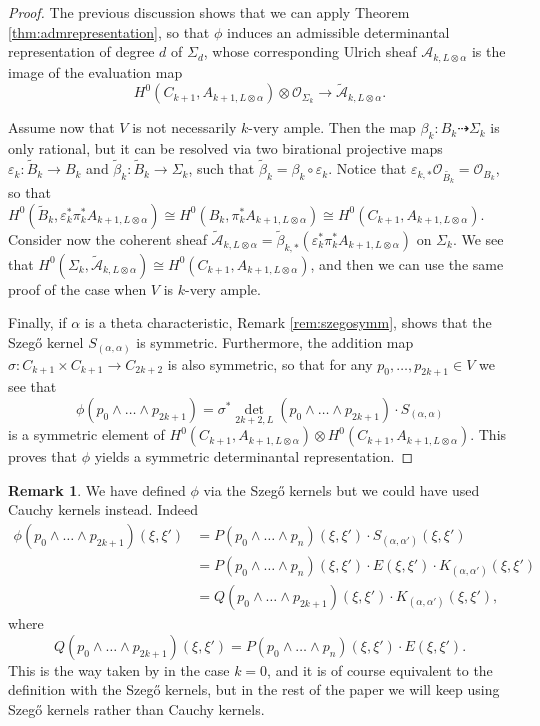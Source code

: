 \documentclass[12pt]{amsart}
\newcounter{thmcounter}
\numberwithin{equation}{section}
\numberwithin{thmcounter}{section}
\theoremstyle{definition}
\newtheorem{remark}[thmcounter]{Remark}
\theoremstyle{claim}
\newcommand{\sA}{\mathscr{A}}
\newcommand{\sO}{\mathscr{O}}
\begin{document}
\begin{proof}
	\noindent
	The previous discussion shows that we can apply Theorem \ref{thm:admrepresentation}, so that $\phi$ induces an admissible determinantal representation of degree $d$ of $\Sigma_d$, whose corresponding Ulrich sheaf $\sA_{k,L\otimes \alpha}$ is the image of the evaluation map
	\[  H^0(C_{k+1},A_{k+1,L\otimes \alpha}) \otimes \sO_{\Sigma_k} \longrightarrow \widetilde{\sA}_{k,L\otimes \alpha}. \]
	\medskip

	\noindent
	Assume now that $V$ is not necessarily $k$-very ample. Then the map $\beta_k\colon B_k \dashrightarrow \Sigma_k$ is only rational, but it can be resolved via two birational projective maps $\varepsilon_k \colon \widetilde{B}_k \to B_k$ and $\widetilde{\beta}_k\colon \widetilde{B}_k \to \Sigma_k$, such that $\widetilde{\beta}_k = \beta_k \circ \varepsilon_k$. Notice that  $\varepsilon_{k,*}\sO_{\widetilde{B_k}} = \sO_{B_k}$, so that  $H^0(\widetilde{B}_k,\varepsilon_k^*\pi_k^*A_{k+1,L\otimes \alpha}) \cong H^0(B_k,\pi_k^*A_{k+1,L\otimes \alpha}) \cong H^0(C_{k+1},A_{k+1,L\otimes \alpha})$. Consider now the coherent sheaf $\widetilde{\sA}_{k,L\otimes \alpha} = \widetilde{\beta}_{k,*}(\varepsilon_k^* \pi_k^* A_{k+1,L\otimes \alpha})$ on $\Sigma_k$. We see that $H^0(\Sigma_k,\widetilde{\sA}_{k,L\otimes \alpha}) \cong H^0(C_{k+1},A_{k+1,L\otimes \alpha})$, and then we can use the same proof of the case when $V$ is $k$-very ample.
	\medskip


	\noindent
	Finally, if $\alpha$ is a theta characteristic, Remark \ref{rem:szegosymm}, shows that the Szeg\H{o} kernel $S_{(\alpha,\alpha)}$ is symmetric. Furthermore, the addition map $\sigma\colon C_{k+1}\times C_{k+1} \to C_{2k+2}$ is also symmetric, so that for any $p_0,\dots,p_{2k+1}\in V$ we see that \[ \phi(p_0\wedge \dots \wedge p_{2k+1}) = \sigma^*\det_{2k+2,L}\left( p_0 \wedge \dots \wedge p_{2k+1}  \right)\cdot S_{(\alpha,\alpha)} \]  is a symmetric element of $H^0(C_{k+1},A_{k+1,L\otimes \alpha}) \otimes H^0(C_{k+1},A_{k+1,L\otimes \alpha})$. This proves that $\phi$ yields a symmetric determinantal representation.
\end{proof}

\begin{remark}
	We have defined $\phi$ via the Szeg\H{o} kernels but we could have used Cauchy kernels instead. Indeed
	\begin{align*}
	\phi(p_0\wedge \dots \wedge p_{2k+1})(\xi,\xi') &=  P(p_0\wedge \dots \wedge p_n)(\xi,\xi') \cdot S_{(\alpha,\alpha')}(\xi,\xi') \\
	& = P(p_0\wedge \dots \wedge p_n)(\xi,\xi')  \cdot E(\xi,\xi')\cdot K_{(\alpha,\alpha')}(\xi,\xi') \\
	& = Q(p_0\wedge \dots \wedge p_{2k+1})(\xi,\xi')\cdot K_{(\alpha,\alpha')}(\xi,\xi'),
	\end{align*}
	where
	\[ Q(p_0\wedge \dots \wedge p_{2k+1})(\xi,\xi') =P(p_0\wedge \dots \wedge p_n)(\xi,\xi')  \cdot E(\xi,\xi').\]
This is the way taken by \cite{shamovichvinnikov} in the case $k=0$, and it is of course equivalent to the definition with the Szeg\H{o} kernels, but in the rest of the paper we will keep using Szeg\H{o} kernels rather than Cauchy kernels.
\end{remark}
\end{document}
